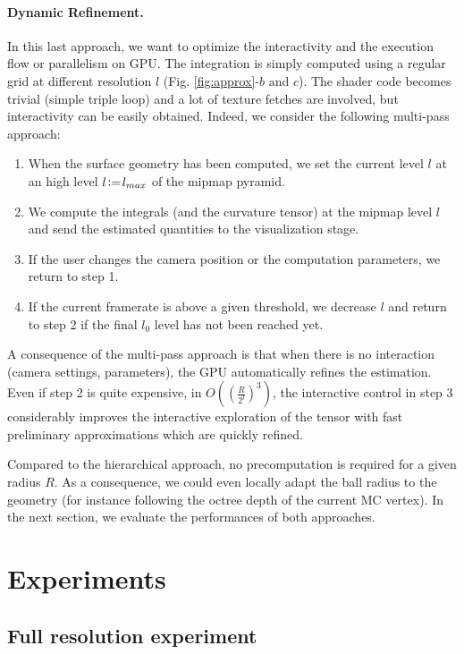 \documentclass{llncs}
\begin{document}
\paragraph{Dynamic Refinement.} In this last approach, we want to optimize
the interactivity and the execution flow or parallelism on GPU. The
integration is simply computed using a regular grid at different
resolution $l$ (Fig. \ref{fig:approx}-$b$ and $c$). The shader code
becomes trivial (simple triple loop) and a lot of texture fetches are
involved, but interactivity can be easily obtained. Indeed, we
consider the following multi-pass approach:
\begin{enumerate}
\item When the surface geometry has been computed, we set the current
  level $l$ at an high level $l\!\mathrel{\mathop:}=\! l_{max}$ of the mipmap
  pyramid.
\item We compute the integrals (and the curvature tensor) at the
  mipmap level $l$ and  send the estimated quantities to the
  visualization stage.
\item If the user changes the camera position or the computation
  parameters, we return to step 1.
\item If the current framerate is above a given threshold, we decrease
  $l$ and return to step 2 if the final $l_0$ level has not been
  reached yet.
\end{enumerate}
A consequence of the multi-pass approach is that when there is no
interaction (camera settings, parameters), the GPU automatically
refines the estimation. Even if step 2 is quite expensive, in
$O\left(\left(\frac{R}{2^l}\right)^3\right)$, the interactive control
in step 3 considerably improves the interactive exploration of the
tensor with fast preliminary approximations which are quickly refined.

Compared to the hierarchical approach, no precomputation is required
for a given radius $R$. As a consequence, we could even locally adapt
the ball radius to the geometry (for instance following the octree
depth of the current MC vertex). In the next section, we evaluate the
performances of both approaches.

\section{Experiments}
\label{sec:experiments}

\subsection{Full resolution experiment}
\end{document}
